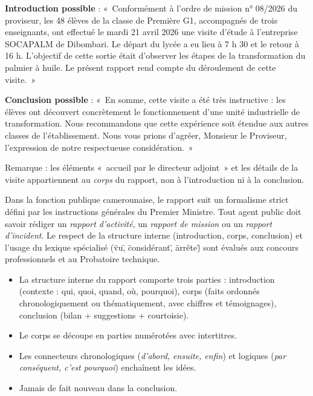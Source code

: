 \documentclass[11pt]{article}
\newcommand{\cle}[1]{{\popxbold\color{popdark}#1}}
\begin{document}
\begin{corrige}[Exercice 1]
\textbf{Introduction possible} : «~Conformément à l'ordre de mission n° 08/2026 du proviseur, les 48 élèves de la classe de Première G1, accompagnés de trois enseignants, ont effectué le mardi 21 avril 2026 une visite d'étude à l'entreprise SOCAPALM de Dibombari. Le départ du lycée a eu lieu à 7 h 30 et le retour à 16 h. L'objectif de cette sortie était d'observer les étapes de la transformation du palmier à huile. Le présent rapport rend compte du déroulement de cette visite.~»

\textbf{Conclusion possible} : «~En somme, cette visite a été très instructive : les élèves ont découvert concrètement le fonctionnement d'une unité industrielle de transformation. Nous recommandons que cette expérience soit étendue aux autres classes de l'établissement. Nous vous prions d'agréer, Monsieur le Proviseur, l'expression de notre respectueuse considération.~»

Remarque : les éléments «~accueil par le directeur adjoint~» et les détails de la visite appartiennent au \emph{corps} du rapport, non à l'introduction ni à la conclusion.
\end{corrige}

\begin{savaistu}
Dans la fonction publique camerounaise, le rapport suit un formalisme strict défini par les instructions générales du Premier Ministre. Tout agent public doit savoir rédiger un \emph{rapport d'activité}, un \emph{rapport de mission} ou un \emph{rapport d'incident}. Le respect de la structure interne (introduction, corps, conclusion) et l'usage du lexique spécialisé (\"vu\", \"considérant\", \"arrête\") sont évalués aux concours professionnels et au Probatoire technique.
\end{savaistu}

\begin{aretenir}
\begin{itemize}
\item La structure interne du rapport comporte trois parties : \cle{introduction} (contexte : qui, quoi, quand, où, pourquoi), \cle{corps} (faits ordonnés chronologiquement ou thématiquement, avec chiffres et témoignages), \cle{conclusion} (bilan + suggestions + courtoisie).
\item Le corps se découpe en parties numérotées avec \cle{intertitres}.
\item Les \cle{connecteurs} chronologiques (\emph{d'abord, ensuite, enfin}) et logiques (\emph{par conséquent, c'est pourquoi}) enchaînent les idées.
\item Jamais de fait nouveau dans la conclusion.
\end{itemize}
\end{aretenir}
\end{document}
